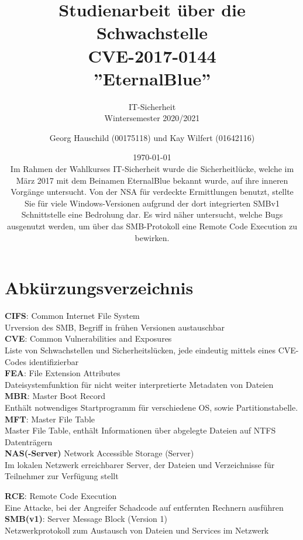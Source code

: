 \documentclass[DIV=12,headings=normal,pdftex,headinclude=false,footinclude=false,final]{scrreprt}
\title{Studienarbeit über die Schwachstelle\\CVE-2017-0144\\''EternalBlue''}
\subtitle{IT-Sicherheit\\Wintersemester 2020/2021}
\author{Georg Hauschild (00175118) und Kay Wilfert (01642116)}
\date{\today \\
Im Rahmen der Wahlkurses IT-Sicherheit wurde die Sicherheitlücke, welche im März 2017 mit dem Beinamen
EternalBlue bekannt wurde, auf ihre inneren Vorgänge untersucht.
Von der NSA für verdeckte Ermittlungen benutzt, stellte Sie für viele Windows-Versionen
aufgrund der dort integrierten SMBv1 Schnittstelle eine Bedrohung dar. Es wird näher untersucht,
welche Bugs ausgenutzt werden, um über das SMB-Protokoll eine Remote Code Execution zu bewirken.
}
\begin{document}
\maketitle


\tableofcontents

\listoffigures

\chapter*{Abkürzungsverzeichnis}

\noindent
\textbf{CIFS}: Common Internet File System\\
Urversion des SMB, Begriff in frühen Versionen austauschbar\\

\noindent
\textbf{CVE}: Common Vulnerabilities and Exposures\\
Liste von Schwachstellen und Sicherheitslücken, jede eindeutig mittels eines CVE-Codes identifizierbar\\

\noindent
\textbf{FEA}: File Extension Attributes\\
Dateisystemfunktion für nicht weiter interpretierte Metadaten von Dateien\\

\noindent
\textbf{MBR}: Master Boot Record\\
Enthält notwendiges Startprogramm für verschiedene OS, sowie Partitionstabelle.\\

\noindent
\textbf{MFT}: Master File Table\\
Master File Table, enthält Informationen über abgelegte Dateien auf NTFS Datenträgern\\

\noindent
\textbf{NAS(-Server)} Network Accessible Storage (Server)\\
Im lokalen Netzwerk erreichbarer Server, der Dateien und Verzeichnisse für Teilnehmer zur Verfügung stellt

\noindent
\textbf{RCE}: Remote Code Execution\\
Eine Attacke, bei der Angreifer Schadcode auf entfernten Rechnern ausführen\\

\noindent
\textbf{SMB(v1)}: Server Message Block (Version 1)\\
Netzwerkprotokoll zum Austausch von Dateien und Services im Netzwerk\\
\end{document}
